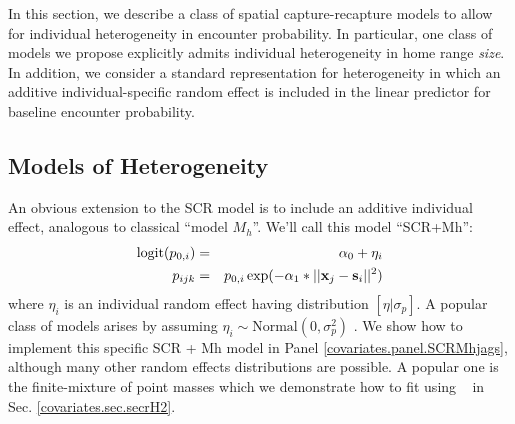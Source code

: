 In this section, we describe a class of spatial capture-recapture
models to allow for individual heterogeneity in encounter
probability.  In particular, one class of models we propose explicitly
admits individual heterogeneity in home range {\it size}. In addition,
we consider a standard representation for heterogeneity in which an
additive individual-specific random effect is included in the linear
predictor for baseline encounter probability.  

\subsection{Models of Heterogeneity}
\label{covariates.sec.heterogeneity}

An obvious extension to the SCR model is to include an additive
individual effect, analogous to classical ``model $M_{h}$''. We'll
call this model ``SCR+Mh'':
\begin{eqnarray*}
\mbox{logit}(p_{0,i})& =& \alpha_0 + \eta_{i} \\
p_{ijk}& = &p_{0,i} \exp(- \alpha_1*||{\bf x}_{j}-{\bf s}_{i}||^2)
\end{eqnarray*}
where $\eta_{i}$ is an individual random effect having distribution
$[\eta|\sigma_{p}]$.  A popular class of models arises by assuming
$\eta_{i} \sim \mbox{Normal}(0,\sigma_{p}^{2})$ \citep{coull_agresti:1999,
dorazio_royle:2003}. 
We show how to implement this specific SCR + Mh model in 
Panel \ref{covariates.panel.SCRMhjags}, although
many other random effects
distributions are possible. A popular one is the finite-mixture of
point masses
\citep{norris_pollock:1996, pledger:2000} which 
we demonstrate how to fit using \secr~ in
Sec. \ref{covariates.sec.secrH2}.  


